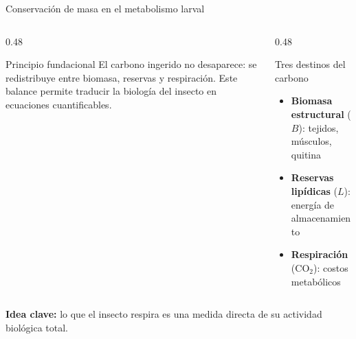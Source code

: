 \documentclass[aspectratio=169, 11pt]{beamer}
\begin{document}
\begin{frame}{Conservaci\'{o}n de masa en el metabolismo larval}
\begin{columns}[T]
\begin{column}{0.48\textwidth}
\begin{block}{Principio fundacional}
El carbono ingerido no desaparece: se redistribuye entre biomasa, reservas y respiraci\'{o}n. Este balance permite traducir la biolog\'{i}a del insecto en ecuaciones cuantificables.
\end{block}
\end{column}
\begin{column}{0.48\textwidth}
\begin{exampleblock}{Tres destinos del carbono}
\begin{itemize}
    \item \textbf{Biomasa estructural} ($B$): tejidos, m\'{u}sculos, quitina
    \item \textbf{Reservas lip\'{i}dicas} ($L$): energ\'{i}a de almacenamiento
    \item \textbf{Respiraci\'{o}n} (CO$_2$): costos metab\'{o}licos
\end{itemize}
\end{exampleblock}
\end{column}
\end{columns}
\vfill
\begin{center}
\textcolor{unalRojo}{\textbf{Idea clave:}} lo que el insecto respira es una medida directa de su actividad biol\'{o}gica total.
\end{center}
\end{frame}
\end{document}
